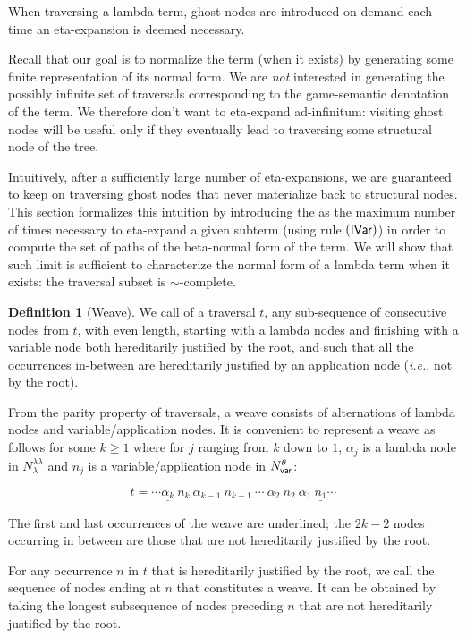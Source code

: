 \documentclass{article}
\makeatletter
\theoremstyle{definition}
\newtheorem{definition}{Definition}[section]
\newcommand\NodesVar{N_{\sf var}}%
\newcommand\NodesLmd{N_\lambda}%
\newcommand{\ghostlmd}{{\lambda\!\!\lambda}}
\newcommand{\ghostvar}{\theta}
\renewcommand\ie{{\it i.e.\@\xspace}}
\makeatother
\begin{document}
When traversing a lambda term, ghost nodes are introduced on-demand each time an eta-expansion is deemed necessary.

Recall that our goal is to normalize the term (when it exists) by generating some finite representation of its normal form. We are \emph{not} interested in generating the possibly infinite set of traversals corresponding to the game-semantic denotation of the term. We therefore don't want to eta-expand ad-infinitum: visiting ghost nodes will be useful only if they eventually lead to traversing some structural node of the tree.

Intuitively, after a sufficiently large number of eta-expansions, we are guaranteed to keep on traversing ghost nodes that never materialize back to structural nodes. This section formalizes this intuition by introducing the  as the maximum number of times necessary to eta-expand a given subterm (using rule $\mathbf{({\sf IVar})}$) in order to compute the set of paths of the beta-normal form of the term. We will show that such limit is sufficient to characterize the normal form of a lambda term when it exists: the traversal subset is $\sim$-complete.

\begin{definition}[Weave]
\label{ref:weave}
We call  of a traversal $t$, any sub-sequence of consecutive nodes from $t$,
with even length, starting with a lambda nodes and finishing with a variable node both hereditarily justified by the root, and such that all the occurrences in-between are hereditarily justified by an application node (\ie, not by the root).

From the parity property of traversals, a weave consists of alternations of lambda nodes and variable/application nodes. It is convenient to represent a weave as follows for some $k\geq 1$ where for $j$ ranging from $k$ down to $1$, $\alpha_j$ is a lambda node in $\NodesLmd^\ghostlmd$ and $n_j$ is a variable/application node in $\NodesVar^\ghostvar$:

$$ t = \cdots \underline{\alpha_k}\ n_k\ \alpha_{k-1}\ n_{k-1}\ \cdots\ \alpha_2\ n_2\ \alpha_1\ \underline{n_1} \cdots $$

The first and last occurrences of the weave are underlined; the $2k-2$ nodes occurring in between are those that are not hereditarily justified by the root.

For any occurrence $n$ in $t$ that is hereditarily justified by the root, we call  the sequence of nodes ending at $n$ that constitutes a weave. It can be obtained by taking the longest subsequence of nodes preceding $n$ that are not hereditarily justified by the root.
\end{definition}
\end{document}
